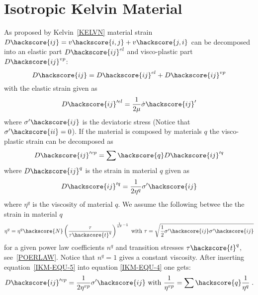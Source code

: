 
\section{Isotropic Kelvin Material \label{IKM}}
As proposed by Kelvin~\ref{KELVN} material strain $D\hackscore{ij}=v\hackscore{i,j}+v\hackscore{j,i}$ can be decomposed into
an elastic part $D\hackscore{ij}^{el}$ and visco-plastic part $D\hackscore{ij}^{vp}$:
\begin{equation}\label{IKM-EQU-2}
D\hackscore{ij}=D\hackscore{ij}^{el}+D\hackscore{ij}^{vp}
\end{equation}
with the elastic strain given as 
\begin{equation}\label{IKM-EQU-3}
D\hackscore{ij}'^{el}=\frac{1}{2 \mu} \dot{\sigma}\hackscore{ij}'
\end{equation}
where $\sigma'\hackscore{ij}$ is the deviatoric stress (Notice that $\sigma'\hackscore{ii}=0$).
If the material is composed by materials $q$ the visco-plastic strain can be decomposed as
\begin{equation}\label{IKM-EQU-4}
D\hackscore{ij}'^{vp}=\sum\hackscore{q} D\hackscore{ij}'^{q} 
\end{equation}
where $D\hackscore{ij}^{q}$ is the strain in material $q$ given as 
\begin{equation}\label{IKM-EQU-5}
D\hackscore{ij}'^{q}=\frac{1}{2 \eta^{q}} \sigma'\hackscore{ij} 
\end{equation}
where $\eta^{q}$ is the viscosity of material $q$. We assume the following 
betwee the the strain in material $q$ 
\begin{equation}\label{IKM-EQU-5b}
\eta^{q}=\eta^{q}\hackscore{N} \left(\frac{\tau}{\tau\hackscore{t}^q}\right)^{\frac{1}{n^{q}}-1}
\mbox{ with } \tau=\sqrt{\frac{1}{2}\sigma'\hackscore{ij} \sigma'\hackscore{ij}}
\end{equation}
for a given power law coefficients $n^{q}$ and transition stresses $\tau\hackscore{t}^q$, see~\ref{POERLAW}.
Notice that $n^{q}=1$ gives a constant viscosity.
After inserting equation~\ref{IKM-EQU-5} into equation \ref{IKM-EQU-4} one gets:
\begin{equation}\label{IKM-EQU-6}
D\hackscore{ij}'^{vp}=\frac{1}{2 \eta^{vp}} \sigma'\hackscore{ij} \mbox{ with } \frac{1}{\eta^{vp}} = \sum\hackscore{q} \frac{1}{\eta^{q}} \;.
\end{equation}
